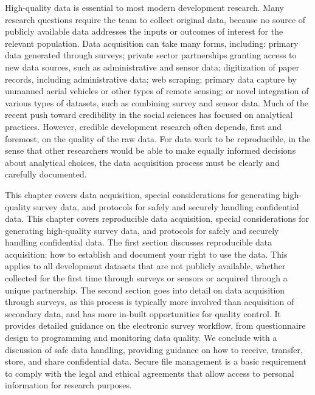 
\begin{fullwidth}
High-quality data is essential to most modern development research.
Many research questions require the team to collect original data,
because no source of publicly available data addresses the
inputs or outcomes of interest for the relevant population.
Data acquisition can take many forms, including:
primary data generated through surveys;
private sector partnerships granting access to new data sources, such as administrative and sensor data;
digitization of paper records, including administrative data; web scraping;
primary data capture by unmanned aerial vehicles or other types of remote sensing;
or novel integration of various types of datasets, such as combining survey and sensor data.
Much of the recent push toward credibility in the social sciences has focused on analytical practices.
However, credible development research often depends, first and foremost, on the quality of the raw data.
For data work to be reproducible,
in the sense that other researchers would be able to make
equally informed decisions about analytical choices,
the data acquisition process must be clearly and carefully documented.

This chapter covers data acquisition,
special considerations for generating high-quality survey data,
and protocols for safely and securely handling confidential data.
This chapter covers reproducible data acquisition,
special considerations for generating high-quality survey data,
and protocols for safely and securely handling confidential data.
The first section discusses reproducible data acquisition:
how to establish and document your right to use the data.
This applies to all development datasets that are not publicly available,
whether collected for the first time through surveys or sensors or acquired through a unique partnership.
The second section goes into detail on data acquisition through surveys,
as this process is typically more involved than acquisition of secondary data,
and has more in-built opportunities for quality control.
It provides detailed guidance on the electronic survey workflow,
from questionnaire design to programming and monitoring data quality.
We conclude with a discussion of safe data handling,
providing guidance on how to receive, transfer, store, and share confidential data.
Secure file management is a basic requirement to comply with the legal and
ethical agreements that allow  access to personal information for research purposes.


\end{fullwidth}

